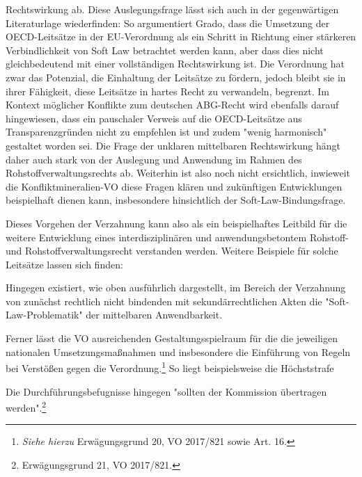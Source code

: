 \documentclass[12pt,a4paper,oneside]{book} %
\begin{document}
Rechtswirkung ab. Diese Auslegungsfrage lässt sich auch in der gegenwärtigen Literaturlage wiederfinden: So argumentiert Grado\autocite{grado_eu_2018}, dass die Umsetzung der OECD-Leitsätze in der EU-Verordnung als ein Schritt in Richtung einer stärkeren Verbindlichkeit von Soft Law betrachtet werden kann, aber dass dies nicht gleichbedeutend mit einer vollständigen Rechtswirkung ist. Die Verordnung hat zwar das Potenzial, die Einhaltung der Leitsätze zu fördern, jedoch bleibt sie in ihrer Fähigkeit, diese Leitsätze in hartes Recht zu verwandeln, begrenzt. Im Kontext möglicher Konflikte zum deutschen ABG-Recht wird ebenfalls darauf hingewiesen, dass ein pauschaler Verweis auf die OECD-Leitsätze aus Transparenzgründen nicht zu empfehlen ist und zudem "wenig harmonisch" gestaltet worden sei.\autocite[42]{teicke_gesetzliche_2018}
Die Frage der unklaren mittelbaren Rechtswirkung hängt daher auch stark von der Auslegung und Anwendung im Rahmen des Rohstoffverwaltungsrechts ab. Weiterhin ist also noch nicht ersichtlich, inwieweit die Konfliktmineralien-VO diese Fragen klären und zukünftigen Entwicklungen beispielhaft dienen kann, insbesondere hinsichtlich der Soft-Law-Bindungsfrage.


Dieses Vorgehen der Verzahnung kann also als ein beispielhaftes Leitbild für die weitere Entwicklung eines interdisziplinären und anwendungsbetontem Rohstoff- und Rohstoffverwaltungsrecht verstanden werden. Weitere Beispiele für solche Leitsätze lassen sich finden: %

Hingegen existiert, wie oben ausführlich dargestellt, im Bereich der Verzahnung von zunächst rechtlich nicht bindenden mit sekundärrechtlichen Akten die "Soft-Law-Problematik" der mittelbaren Anwendbarkeit.

Ferner lässt die VO ausreichenden Gestaltungsspielraum für die die jeweiligen nationalen Umsetzungsmaßnahmen und insbesondere die Einführung von Regeln bei Verstößen gegen die Verordnung.\footnote{\textit{Siehe hierzu} Erwägungsgrund 20, VO 2017/821 sowie Art. 16.} So liegt beispielsweise die Höchststrafe 

Die Durchführungsbefugnisse hingegen "sollten der Kommission übertragen werden".\footnote{Erwägungsgrund 21, VO 2017/821.} 

\end{document}

